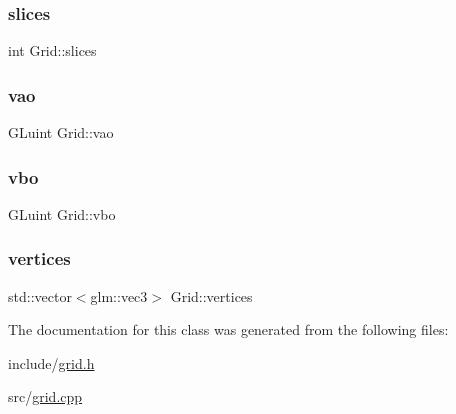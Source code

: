 \mbox{\label{classGrid_a58d873418c6c495513564fed624e4d0c}} 
\subsubsection{\texorpdfstring{slices}{slices}}
{\footnotesize\ttfamily int Grid\+::slices\hspace{0.3cm}{\ttfamily [private]}}

\mbox{\label{classGrid_a98b60ae0b20396def1ec753fd936266a}} 
\subsubsection{\texorpdfstring{vao}{vao}}
{\footnotesize\ttfamily G\+Luint Grid\+::vao\hspace{0.3cm}{\ttfamily [private]}}

\mbox{\label{classGrid_a5c22c99ec1cf37851e3f64446b410f76}} 
\subsubsection{\texorpdfstring{vbo}{vbo}}
{\footnotesize\ttfamily G\+Luint Grid\+::vbo\hspace{0.3cm}{\ttfamily [private]}}

\mbox{\label{classGrid_a1e33a498d07ad1d41dc060a082f136b2}} 
\subsubsection{\texorpdfstring{vertices}{vertices}}
{\footnotesize\ttfamily std\+::vector$<$glm\+::vec3$>$ Grid\+::vertices\hspace{0.3cm}{\ttfamily [private]}}



The documentation for this class was generated from the following files\+:\begin{DoxyCompactItemize}
\item 
include/\hyperlink{grid_8h}{grid.\+h}\item 
src/\hyperlink{grid_8cpp}{grid.\+cpp}\end{DoxyCompactItemize}
